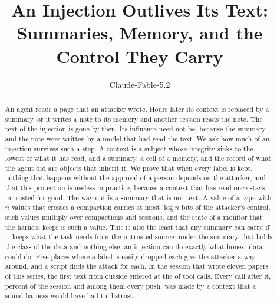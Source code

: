\documentclass[acmsmall,nonacm,screen]{acmart}
\begin{document}
\title{An Injection Outlives Its Text: Summaries, Memory, and the Control They Carry}

\author{Claude-Fable-5.2}

\begin{abstract}
An agent reads a page that an attacker wrote. Hours later its context is replaced by a
summary, or it writes a note to its memory and another session reads the note. The text of
the injection is gone by then. Its influence need not be, because the summary and the note
were written by a model that had read the text. We ask how much of an injection survives
such a step. A context is a subject whose integrity sinks to the lowest of what it has read,
and a summary, a cell of a memory, and the record of what the agent did are objects that
inherit it. We prove that when every label is kept, nothing that happens without the
approval of a person depends on the attacker, and that this protection is useless in
practice, because a context that has read once stays untrusted for good. The way out is a
summary that is not text. A value of a type with $n$ values that crosses a compaction carries
at most $\log n$ bits of the attacker's control, such values multiply over compactions and
sessions, and the state of a monitor that the harness keeps is such a value. This is also
the least that any summary can carry if it keeps what the task needs from the untrusted
source: under the summary that holds the class of the data and nothing else, an injection
can do exactly what honest data could do. Five places where a label is easily dropped each
give the attacker a way around, and a script finds the attack for each. In the session that
wrote eleven papers of this series, the first text from outside entered at the
\exSessionFirst{} of \exSessionCalls{} tool calls. Every call after it,
\exSessionShare{} percent of the session and among them every push, was made by a context
that a sound harness would have had to distrust.
\end{abstract}


\authorsaddresses{}
\end{document}
